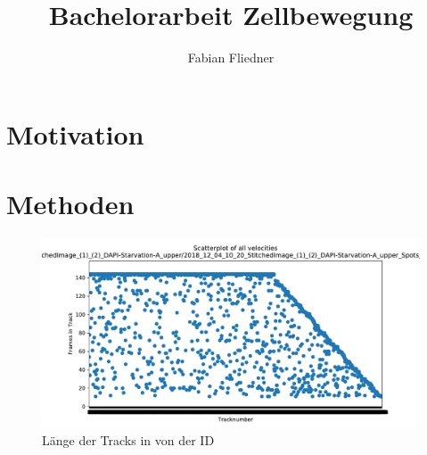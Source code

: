 \documentclass[]{article}
\title{Bachelorarbeit Zellbewegung}
\author{Fabian Fliedner}
\begin{document}
\maketitle

\begin{abstract}

\end{abstract}

\section{Motivation}
\section{Methoden}
\begin{figure}
	\centering
	\includegraphics[width=0.7\linewidth]{BildDateien/length_of_all_tracks}
	\caption[Tracklänge nach ID]{Länge der Tracks in von der ID}
	\label{fig:lengthofalltracks}
\end{figure}
\end{document}
